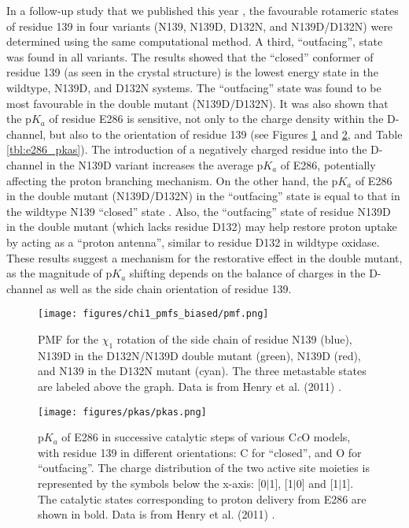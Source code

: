 In a follow-up study that we published this year \cite{Henry:2011p10221}, the favourable rotameric states of residue 139 in four variants (N139, N139D, D132N, and N139D/D132N) were determined using the same computational method. A third, ``outfacing'', state was found in all variants. The results showed that the ``closed'' conformer of residue 139 (as seen in the crystal structure) is the lowest energy state in the wildtype, N139D, and D132N systems. The ``outfacing'' state was found to be most favourable in the double mutant (N139D/D132N). It was also shown that the p$K_a$ of residue E286 is sensitive, not only to the charge density within the D-channel, but also to the orientation of residue 139 (see Figures \ref{fig:pmf_chi1_biased} and \ref{fig:pkas}, and Table \ref{tbl:e286_pkas}). The introduction of a negatively charged residue into the D-channel in the N139D variant increases the average p$K_a$ of E286, potentially affecting the proton branching mechanism. On the other hand, the p$K_a$ of E286 in the double mutant (N139D/D132N) in the ``outfacing'' state is equal to that in the wildtype N139 ``closed'' state \cite{Henry:2011p10221}. Also, the ``outfacing'' state of residue N139D in the double mutant (which lacks residue D132) may help restore proton uptake by acting as a ``proton antenna'', similar to residue D132 in wildtype oxidase. These results suggest a mechanism for the restorative effect in the double mutant, as the magnitude of p$K_a$ shifting depends on the balance of charges in the D-channel as well as the side chain orientation of residue 139.

\begin{figure}[htbp]
\centering
\texttt{[image: figures/chi1\_pmfs\_biased/pmf.png]}
\caption[PMF for the $\chi_1$ rotation of the side chain of residue 139 in wildtype and mutant cytochrome \emph{c} oxidase in a simplified simulation model.]{PMF for the $\chi_1$ rotation of the side chain of residue N139 (blue), N139D in the D132N/N139D double mutant (green), N139D (red), and N139 in the D132N mutant (cyan). The three metastable states are labeled above the graph. Data is from Henry et al. (2011) \cite{Henry:2011p10221}.}
\label{fig:pmf_chi1_biased}
\end{figure}

\begin{figure}[htbp]
\centering
\texttt{[image: figures/pkas/pkas.png]}
\caption[p$K_a$ of E286 in successive catalytic steps of various C\emph{c}O models, with residue 139 in different orientations.]{p$K_a$ of E286 in successive catalytic steps of various C\emph{c}O models, with residue 139 in different orientations: C for ``closed'', and O for ``outfacing''. The charge distribution of the two active site moieties is represented by the symbols below the x-axis: [0$\mid$1], [1$\mid$0] and [1$\mid$1]. The catalytic states corresponding to proton delivery from E286 are shown in bold. Data is from Henry et al. (2011) \cite{Henry:2011p10221}.}
\label{fig:pkas}
\end{figure}

